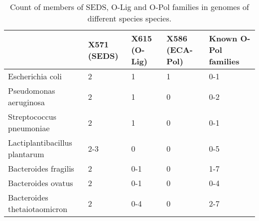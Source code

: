 \documentclass{article}
\begin{document}
\begin{table}[!ht]
    \centering
    \begin{tabular}{|l|l|l|l|l|}
    \hline
        ~ & X571 (SEDS) & X615 (O-Lig) & X586 (ECA-Pol) & Known O-Pol families \\ \hline
        Escherichia coli & 2 & 1 & 1 & 0-1 \\ \hline
        Pseudomonas aeruginosa & 2 & 1 & 0 & 0-2 \\ \hline
        Streptococcus pneumoniae & 2 & 1 & 0 & 0-1 \\ \hline
        Lactiplantibacillus plantarum & 2-3 & 0 & 0 & 0-5 \\ \hline
        Bacteroides fragilis & 2 & 0-1 & 0 & 1-7 \\ \hline
        Bacteroides ovatus & 2 & 0-1 & 0 & 0-4 \\ \hline
        Bacteroides thetaiotaomicron & 2 & 0-4 & 0 & 2-7 \\ \hline
    \end{tabular}
    \caption{Count of members of SEDS, O-Lig and O-Pol families in genomes of different species species.}
    \label{tab:count_members_species}
\end{table}
\end{document}
